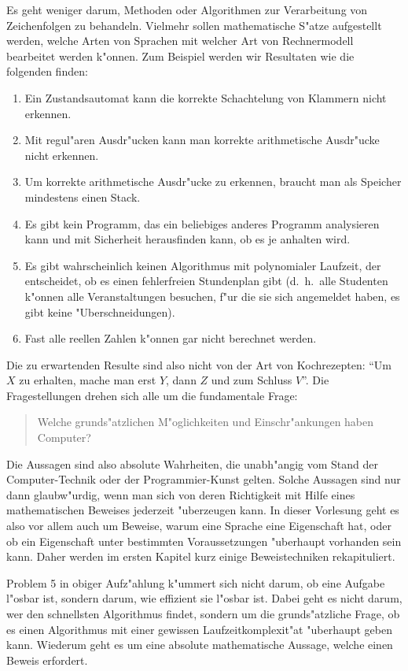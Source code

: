 Es geht weniger darum, Methoden oder Algorithmen zur Verarbeitung
von Zeichenfolgen zu behandeln.
Vielmehr sollen mathematische S"atze aufgestellt werden, welche
Arten von Sprachen mit welcher Art von Rechnermodell bearbeitet
werden k"onnen.
Zum Beispiel werden wir Resultaten wie die folgenden finden:
\begin{enumerate}
\item Ein Zustandsautomat kann die korrekte Schachtelung von
Klammern nicht erkennen.
\item Mit regul"aren Ausdr"ucken kann man korrekte arithmetische
Ausdr"ucke nicht erkennen.
\item Um korrekte arithmetische Ausdr"ucke zu erkennen, braucht man als
Speicher mindestens einen Stack.
\item Es gibt kein Programm, das ein beliebiges anderes Programm
analysieren kann und mit Sicherheit herausfinden kann, ob es je anhalten
wird.
\item Es gibt wahrscheinlich keinen Algorithmus mit polynomialer Laufzeit,
der entscheidet, ob es einen fehlerfreien Stundenplan gibt (d.~h.~alle 
Studenten k"onnen alle Veranstaltungen besuchen, f"ur die sie sich
angemeldet haben, es gibt keine "Uberschneidungen).
\item Fast alle reellen Zahlen k"onnen gar nicht berechnet werden.
\end{enumerate}
Die zu erwartenden Resulte sind also nicht von der Art von Kochrezepten:
``Um $X$ zu erhalten, mache man erst $Y$, dann $Z$ und zum Schluss $V$''.
Die Fragestellungen drehen sich alle um die fundamentale Frage:
\begin{quote}
Welche grunds"atzlichen M"oglichkeiten und Einschr"ankungen haben
Computer?
\end{quote}
Die Aussagen sind also absolute Wahrheiten, die unabh"angig vom Stand
der Com\-pu\-ter-Technik oder der Programmier-Kunst gelten.
Solche Aussagen sind nur dann glaub\-w"urdig, wenn man sich von deren
Richtigkeit mit Hilfe eines mathematischen Beweises jederzeit "uberzeugen
kann. In dieser Vorlesung geht es also vor allem auch um Beweise, 
warum eine Sprache eine Eigenschaft hat, oder ob ein Eigenschaft
unter bestimmten Voraussetzungen "uberhaupt vorhanden sein kann.
Daher werden im ersten Kapitel kurz einige Beweistechniken rekapituliert.

Problem 5 in obiger Aufz"ahlung k"ummert sich nicht darum, ob eine
Aufgabe l"osbar ist, sondern darum, wie effizient sie l"osbar ist.
Dabei geht es nicht darum, wer den schnellsten Algorithmus findet,
sondern um die grunds"atzliche Frage, ob es einen Algorithmus mit
einer gewissen Laufzeitkomplexit"at "uberhaupt geben kann.
Wiederum geht es um eine absolute mathematische Aussage, welche
einen Beweis erfordert. 

